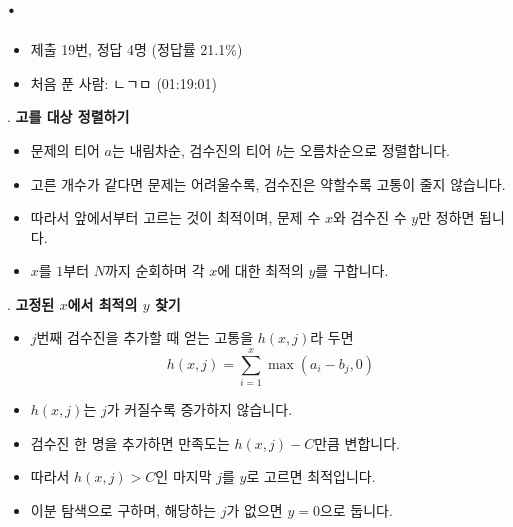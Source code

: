 
\section{\texorpdfstring{\pletter. \ptitle}{문제 \pletter}}

\begin{frame}[label=problem-J]
    \sectiontitle{\pletter}{\ptitle}
    \begin{itemize}
        \item 제출 19번, 정답 4명 (정답률 21.1\%)
        \item 처음 푼 사람: ㄴㄱㅁ (01:19:01)
    \end{itemize}
\end{frame}

\begin{frame}{\textbf{\pletter}. \ptitle}
    \textbf{고를 대상 정렬하기}
    \begin{itemize}
        \item 문제의 티어 $a$는 내림차순, 검수진의 티어 $b$는 오름차순으로 정렬합니다.
        \item 고른 개수가 같다면 문제는 어려울수록, 검수진은 약할수록 고통이 줄지 않습니다.
        \item 따라서 앞에서부터 고르는 것이 최적이며, 문제 수 $x$와 검수진 수 $y$만 정하면 됩니다.
        \item $x$를 $1$부터 $N$까지 순회하며 각 $x$에 대한 최적의 $y$를 구합니다.
    \end{itemize}
\end{frame}

\begin{frame}{\textbf{\pletter}. \ptitle}
    \textbf{고정된 $x$에서 최적의 $y$ 찾기}
    \begin{itemize}
        \item $j$번째 검수진을 추가할 때 얻는 고통을 $h(x,j)$라 두면
        \[
            h(x,j)=\sum_{i=1}^{x}\max(a_i-b_j,0)
        \]
        \item $h(x,j)$는 $j$가 커질수록 증가하지 않습니다.
        \item 검수진 한 명을 추가하면 만족도는 $h(x,j)-C$만큼 변합니다.
        \item 따라서 $h(x,j)>C$인 마지막 $j$를 $y$로 고르면 최적입니다.
        \item 이분 탐색으로 구하며, 해당하는 $j$가 없으면 $y=0$으로 둡니다.
    \end{itemize}
\end{frame}

